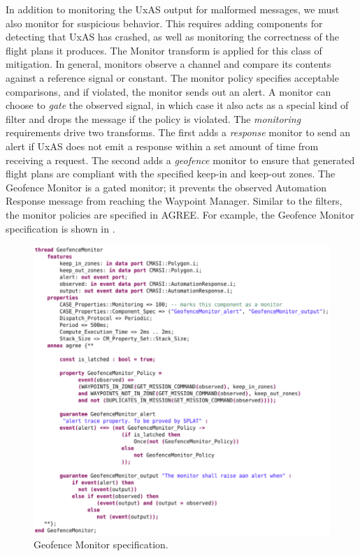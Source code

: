 In addition to monitoring the UxAS output for malformed messages, we must also monitor for suspicious behavior.  This requires adding components for detecting that UxAS has crashed, as well as monitoring the correctness of the flight plans it produces.  The Monitor transform is applied for this class of mitigation.  In general, monitors observe a channel and compare its contents against a reference signal or constant.  The monitor policy specifies acceptable comparisons, and if violated, the monitor sends out an alert.  A monitor can choose to \textit{gate} the observed signal, in which case it also acts as a special kind of filter and drops the message if the policy is violated.  The \textit{monitoring} requirements drive two transforms.  The first adds a \textit{response} monitor to send an alert if UxAS does not emit a response within a set amount of time from receiving a request.  The second adds a \textit{geofence} monitor to ensure that generated flight plans are compliant with the specified keep-in and keep-out zones.  The Geofence Monitor is a gated monitor; it prevents the observed Automation Response message from reaching the Waypoint Manager.
%
Similar to the filters, the monitor policies are specified in AGREE. For example,
the Geofence Monitor specification is shown in .


\begin{figure}[h]
	\centering
	\includegraphics[width=1\columnwidth]{figs/geofence-monitor.png}
	\caption{Geofence Monitor specification.}
	\label{fig:geofence-monitor}
\end{figure}

